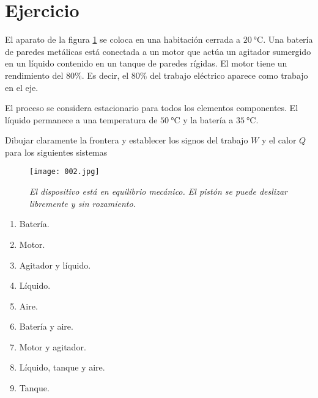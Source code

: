 \section{Ejercicio}\label{ej:Chap02Ejercicio01}

El aparato de la figura \ref{im:002} se coloca en una habitación cerrada a $\SI{20}{\celsius}$. Una batería de paredes metálicas está conectada a un motor que actúa un agitador sumergido en un líquido contenido en un tanque de paredes rígidas. El motor tiene un rendimiento del $80\%$. Es decir, el $80\%$ del trabajo eléctrico aparece como trabajo en el eje.

El proceso se considera estacionario para todos los elementos componentes. El líquido permanece a una temperatura de $\SI{50}{\celsius}$ y la batería a $\SI{35}{\celsius}$.

Dibujar claramente la frontera y establecer los signos del trabajo $W$ y el calor $Q$ para los siguientes sistemas

\begin{figure}[h]
\centerline{\texttt{[image: 002.jpg]}}
\caption{\textit{El dispositivo está en equilibrio mecánico. El pistón se puede deslizar libremente y sin rozamiento.}}
\label{im:002}
\end{figure}

\begin{enumerate}
\item Batería.
\item Motor.
\item Agitador y líquido.
\item Líquido.
\item Aire.
\item Batería y aire.
\item Motor y agitador.
\item Líquido, tanque y aire.
\item Tanque.
\end{enumerate}